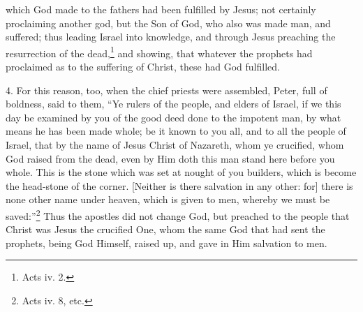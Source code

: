 which God made to the fathers had been fulfilled by Jesus; not certainly proclaiming another god, but the Son of God, who also was made man, and suffered; thus leading Israel into knowledge, and through Jesus preaching the resurrection of the dead,\footnote{Acts iv. 2.} and showing, that whatever the prophets had proclaimed as to the suffering of Christ, these had God fulfilled.

4. For this reason, too, when the chief priests were assembled, Peter, full of boldness, said to them, “Ye rulers of the people, and elders of Israel, if we this day be examined by you of the good deed done to the impotent man, by what means he has been made whole; be it known to you all, and to all the people of Israel, that by the name of Jesus Christ of Nazareth, whom ye crucified, whom God raised from the dead, even by Him doth this man stand here before you whole. This is the stone which was set at nought of you builders, which is become the head-stone of the corner. [Neither is there salvation in any other: for] there is none other name under heaven, which is given to men, whereby we must be saved:”\footnote{Acts iv. 8, etc.} Thus the apostles did not change God, but preached to the people that Christ was Jesus the crucified One, whom the same God that had sent the prophets, being God Himself, raised up, and gave in Him salvation to men.

